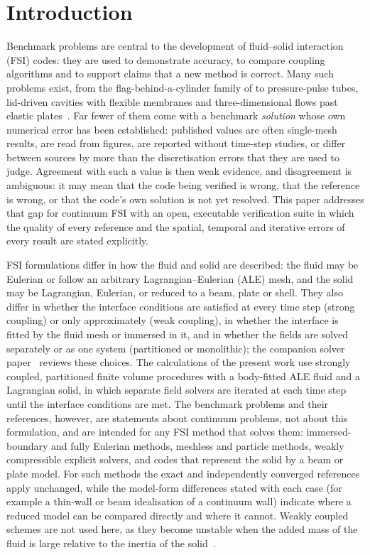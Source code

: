 \section{Introduction}\label{sec:intro}
Benchmark problems are central to the development of fluid--solid interaction (FSI) codes: they are used to demonstrate accuracy, to compare coupling algorithms and to support claims that a new method is correct.
Many such problems exist, from the flag-behind-a-cylinder family of \citet{Turek2006} to pressure-pulse tubes, lid-driven cavities with flexible membranes and three-dimensional flows past elastic plates~\citep{Richter2012, Failer2020}.
Far fewer of them come with a benchmark \emph{solution} whose own numerical error has been established: published values are often single-mesh results, are read from figures, are reported without time-step studies, or differ between sources by more than the discretisation errors that they are used to judge.
Agreement with such a value is then weak evidence, and disagreement is ambiguous: it may mean that the code being verified is wrong, that the reference is wrong, or that the code's own solution is not yet resolved.
This paper addresses that gap for continuum FSI with an open, executable verification suite in which the quality of every reference and the spatial, temporal and iterative errors of every result are stated explicitly.

FSI formulations differ in how the fluid and solid are described: the fluid may be Eulerian or follow an arbitrary Lagrangian--Eulerian (ALE) mesh, and the solid may be Lagrangian, Eulerian, or reduced to a beam, plate or shell.
They also differ in whether the interface conditions are satisfied at every time step (strong coupling) or only approximately (weak coupling), in whether the interface is fitted by the fluid mesh or immersed in it, and in whether the fields are solved separately or as one system (partitioned or monolithic); the companion solver paper~\citep{CardiffBatistic2026QM} reviews these choices.
The calculations of the present work use strongly coupled, partitioned finite volume procedures with a body-fitted ALE fluid and a Lagrangian solid, in which separate field solvers are iterated at each time step until the interface conditions are met.
The benchmark problems and their references, however, are statements about continuum problems, not about this formulation, and are intended for any FSI method that solves them: immersed-boundary and fully Eulerian methods, meshless and particle methods, weakly compressible explicit solvers, and codes that represent the solid by a beam or plate model.
For such methods the exact and independently converged references apply unchanged, while the model-form differences stated with each case (for example a thin-wall or beam idealisation of a continuum wall) indicate where a reduced model can be compared directly and where it cannot.
Weakly coupled schemes are not used here, as they become unstable when the added mass of the fluid is large relative to the inertia of the solid~\citep{Causin2005, Forster2006}.

